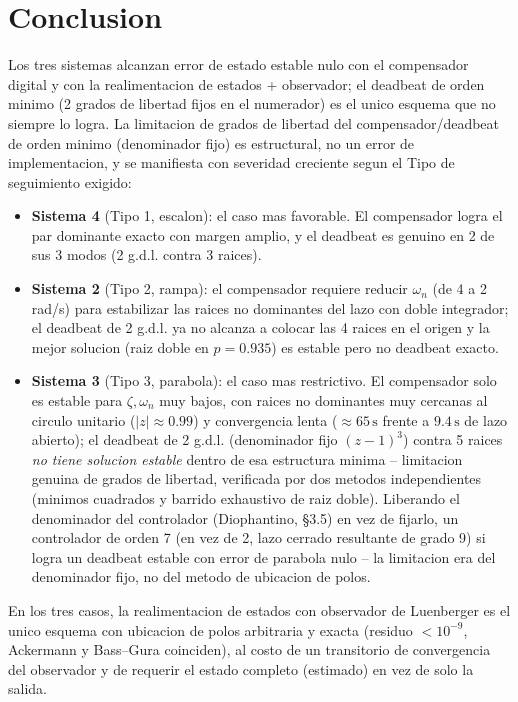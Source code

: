 \documentclass[11pt]{article}
\begin{document}
\section*{Conclusion}
Los tres sistemas alcanzan error de estado estable nulo con el compensador
digital y con la realimentacion de estados + observador; el deadbeat de
orden minimo (2 grados de libertad fijos en el numerador) es el unico
esquema que no siempre lo logra. La limitacion de grados de libertad del
compensador/deadbeat de orden minimo (denominador fijo) es estructural, no
un error de implementacion, y se manifiesta con severidad creciente segun
el Tipo de seguimiento exigido:
\begin{itemize}
\item \textbf{Sistema 4} (Tipo 1, escalon): el caso mas favorable. El
compensador logra el par dominante exacto con margen amplio, y el deadbeat
es genuino en 2 de sus 3 modos (2 g.d.l. contra 3 raices).
\item \textbf{Sistema 2} (Tipo 2, rampa): el compensador requiere reducir
$\omega_n$ (de 4 a 2 rad/s) para estabilizar las raices no dominantes del
lazo con doble integrador; el deadbeat de 2 g.d.l. ya no alcanza a colocar
las 4 raices en el origen y la mejor solucion (raiz doble en $p=0.935$) es
estable pero no deadbeat exacto.
\item \textbf{Sistema 3} (Tipo 3, parabola): el caso mas restrictivo. El
compensador solo es estable para $\zeta,\omega_n$ muy bajos, con raices no
dominantes muy cercanas al circulo unitario ($|z|\approx0.99$) y
convergencia lenta ($\approx65\,\mathrm s$ frente a $9.4\,\mathrm s$ de
lazo abierto); el deadbeat de 2 g.d.l. (denominador fijo $(z-1)^3$) contra 5
raices \emph{no tiene solucion estable} dentro de esa estructura minima --
limitacion genuina de grados de libertad, verificada por dos metodos
independientes (minimos cuadrados y barrido exhaustivo de raiz doble).
Liberando el denominador del controlador (Diophantino, \S3.5) en vez de
fijarlo, un controlador de orden 7 (en vez de 2, lazo cerrado resultante de
grado 9) si logra un deadbeat estable con error de parabola nulo -- la
limitacion era del denominador fijo, no del metodo de ubicacion de polos.
\end{itemize}
En los tres casos, la realimentacion de estados con observador de Luenberger
es el unico esquema con ubicacion de polos arbitraria y exacta (residuo
$<10^{-9}$, Ackermann y Bass--Gura coinciden), al costo de un transitorio de
convergencia del observador y de requerir el estado completo (estimado)
en vez de solo la salida.
\end{document}
